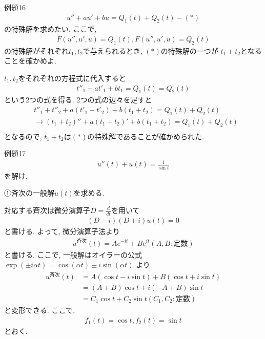 \documentclass[a4paper,12pt]{jlreq}
\begin{document}
\begin{itembox}[l]{例題16}
\begin{align*}
    u'' + au' + bu = Q_1(t) + Q_2(t)　-(\ast)
\end{align*}
の特殊解を求めたい. ここで, 
\begin{align*}
    F(u'', u', u) = Q_1(t), F(u'', u', u) = Q_2(t)
\end{align*}
の特殊解がそれぞれ$t_1,t_2$で与えられるとき, $(\ast)$の特殊解の一つが
$t_1+t_2$となることを確かめよ.
\end{itembox}

\par
$t_1,t_2$をそれぞれの方程式に代入すると
\begin{align*}
    t''_1 + at'_1 + bt_1 = Q_1(t) = Q_2(t)
\end{align*}
という2つの式を得る. 2つの式の辺々を足すと
\begin{align*}
    &t''_1 + t''_2 + a(t'_1 + t'_2) + b(t_1 + t_2) = Q_1(t) + Q_2(t)\\
    &\rightarrow (t_1 + t_2)'' + a(t_1 + t_2)' + b(t_1 + t_2) = Q_1(t) + Q_2(t)\\
\end{align*}
となるので, $t_1 + t_2$は$(\ast)$の特殊解であることが確かめられた. 


\vspace{10mm}

\begin{itembox}[l]{例題17}
\begin{align*}
    u''(t) + u(t) = \frac{1}{\sin t}
\end{align*}
を解け.
\end{itembox}

\par
①斉次の一般解$u(t)$を求める.\par

対応する斉次は微分演算子$D=\frac{d}{dt}$を用いて
\begin{align*}
    (D - i)(D + i)u(t) = 0
\end{align*}
と書ける. よって, 微分演算子法より
\begin{align*}
    u^{\text{斉次}}(t) = Ae^{-it} + Be^{it}　(A,B:\text{定数})
\end{align*}
と書ける. ここで, 一般解はオイラーの公式
$\exp(\pm i\alpha t) = \cos (\alpha t) \pm i\sin (\alpha t)$ より
\begin{align*}
    u^{斉次}(t) &= A(\cos t - i\sin t) + B(\cos t + i\sin t)\\
               &= (A+B)\cos t + i(-A+B) \sin t\\
               &= C_1 \cos t + C_2 \sin t　(C_1,C_2:\text{定数})
\end{align*}
と変形できる. ここで, 
\begin{align*}
    f_1 (t) = \cos t, f_2 (t) = \sin t
\end{align*}
とおく. 
\end{document}
